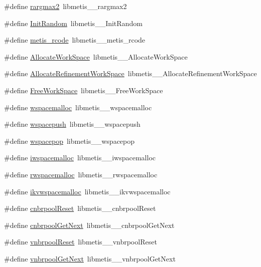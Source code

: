 \begin{DoxyCompactItemize}
\#define \hyperlink{a00957_a7b80ec3a22ade35951c8f3f516c59359}{rargmax2}~libmetis\+\_\+\+\_\+rargmax2
\item 
\#define \hyperlink{a00957_a811f54209b9a730949cc631468e3097b}{Init\+Random}~libmetis\+\_\+\+\_\+\+Init\+Random
\item 
\#define \hyperlink{a00957_a03b9251efb3b3c394f3d16d09a9166bf}{metis\+\_\+rcode}~libmetis\+\_\+\+\_\+metis\+\_\+rcode
\item 
\#define \hyperlink{a00957_ac97e6777401013272b67af78f4614ed1}{Allocate\+Work\+Space}~libmetis\+\_\+\+\_\+\+Allocate\+Work\+Space
\item 
\#define \hyperlink{a00957_aef45ce1f26b8f23a237ccd0cd0cf0882}{Allocate\+Refinement\+Work\+Space}~libmetis\+\_\+\+\_\+\+Allocate\+Refinement\+Work\+Space
\item 
\#define \hyperlink{a00957_a0f35876c106f6d08bd6af799d43ee7ac}{Free\+Work\+Space}~libmetis\+\_\+\+\_\+\+Free\+Work\+Space
\item 
\#define \hyperlink{a00957_a16d147e03401f232c59d1d47e2ce6695}{wspacemalloc}~libmetis\+\_\+\+\_\+wspacemalloc
\item 
\#define \hyperlink{a00957_ae35da7eb18da07e852cc25c86d50f2fa}{wspacepush}~libmetis\+\_\+\+\_\+wspacepush
\item 
\#define \hyperlink{a00957_aeca6de61961abd1343e56f34f3ec6fdc}{wspacepop}~libmetis\+\_\+\+\_\+wspacepop
\item 
\#define \hyperlink{a00957_a9e5789360afa3a6a7b99bf5885a078e4}{iwspacemalloc}~libmetis\+\_\+\+\_\+iwspacemalloc
\item 
\#define \hyperlink{a00957_aedb45cb38d835692482d6ad7456e3884}{rwspacemalloc}~libmetis\+\_\+\+\_\+rwspacemalloc
\item 
\#define \hyperlink{a00957_ab5ec3bf63a1d1059352ad5edf53fbcb4}{ikvwspacemalloc}~libmetis\+\_\+\+\_\+ikvwspacemalloc
\item 
\#define \hyperlink{a00957_af7a5a795e87cab732936fa2e05101d37}{cnbrpool\+Reset}~libmetis\+\_\+\+\_\+cnbrpool\+Reset
\item 
\#define \hyperlink{a00957_ab59551593bb88c609b363f01e1cc065c}{cnbrpool\+Get\+Next}~libmetis\+\_\+\+\_\+cnbrpool\+Get\+Next
\item 
\#define \hyperlink{a00957_a9a4b28eb6ef919f438eef2b81e0a6f83}{vnbrpool\+Reset}~libmetis\+\_\+\+\_\+vnbrpool\+Reset
\item 
\#define \hyperlink{a00957_a575ae51ec414ffb7c6a2024b04986121}{vnbrpool\+Get\+Next}~libmetis\+\_\+\+\_\+vnbrpool\+Get\+Next
\end{DoxyCompactItemize}


